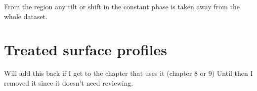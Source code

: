 From the region any tilt or shift in the constant phase is taken away from the whole dataset. %



\section{Treated surface profiles}
Will add this back if I get to the chapter that uses it (chapter 8 or 9)
Until then I removed it since it doesn't need reviewing.


\newpage